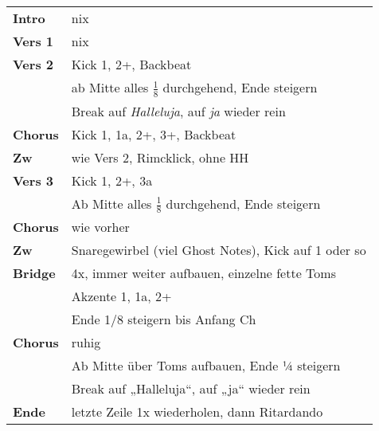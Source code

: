 
\begin{tabular}{p{1.6cm}l}
	\textbf{Intro}  & nix                                                       \\
	\textbf{Vers 1} & nix                                                       \\
	\textbf{Vers 2} & Kick 1, 2+, Backbeat                                      \\
	                & ab Mitte alles $\frac{1}{8}$ durchgehend, Ende steigern   \\
	                & Break auf \textit{Halleluja}, auf \textit{ja} wieder rein \\
	\textbf{Chorus} & Kick 1, 1a, 2+, 3+, Backbeat                              \\
	\textbf{Zw}     & wie Vers 2, Rimcklick, ohne HH                            \\
	\textbf{Vers 3} & Kick 1, 2+, 3a                                            \\
	                & Ab Mitte alles $\frac{1}{8}$ durchgehend, Ende steigern   \\
	\textbf{Chorus} & wie vorher                                                \\
	\textbf{Zw}     & Snaregewirbel (viel Ghost Notes), Kick auf 1 oder so      \\
	\textbf{Bridge} & 4x, immer weiter aufbauen, einzelne fette Toms            \\
	                & Akzente 1, 1a, 2+                                         \\
	                & Ende 1/8 steigern bis Anfang Ch                           \\
	\textbf{Chorus} & ruhig                                                     \\
	                & Ab Mitte über Toms aufbauen, Ende ¼ steigern              \\
	                & Break auf „Halleluja“, auf „ja“ wieder rein               \\
	\textbf{Ende}   & letzte Zeile 1x wiederholen, dann Ritardando              \\
\end{tabular}
